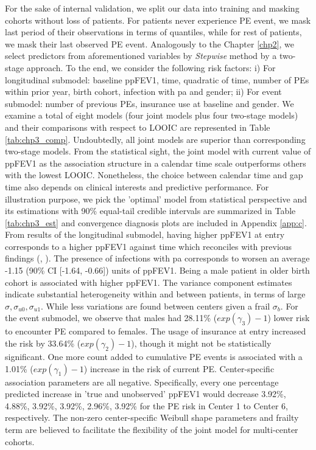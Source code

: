 For the sake of internal validation, we split our data into training and masking cohorts without loss of patients. For patients never experience PE event, we mask last period of their observations in terms of quantiles, while for rest of patients, we mask their last observed PE event. Analogously to the Chapter \ref{chp2}, we select predictors from aforementioned variables by \emph{Stepwise} method by a two-stage approach. To the end, we consider the following risk factors: i) For longitudinal submodel: baseline ppFEV1, time, quadratic of time, number of PEs within prior year, birth cohort, infection with pa and gender; ii) For event submodel: number of previous PEs, insurance use at baseline and gender. We examine a total of eight models (four joint models plus four two-stage models) and their comparisons with respect to LOOIC are represented in Table \ref{tab:chp3_comp}. Undoubtedly, all joint models are superior than corresponding two-stage models. From the statistical sight, the joint model with current value of ppFEV1 as the association structure in a calendar time scale outperforms others with the lowest LOOIC. Nonetheless, the choice between calendar time and gap time also depends on clinical interests and predictive performance. For illustration purpose, we pick the 'optimal' model from statistical perspective and its estimations with 90\% equal-tail credible intervals are summarized in Table \ref{tab:chp3_est} and convergence diagnosis plots are included in Appendix \ref{app:c}. From results of the longitudinal submodel, having higher ppFEV1 at entry corresponds to a higher ppFEV1 against time which reconciles with previous findings (\cite{TaylorRobinson2012}, \cite{Li2017}). The presence of infections with pa corresponds to worsen an average -1.15 (90\% CI [-1.64, -0.66]) units of ppFEV1. Being a male patient in older birth cohort is associated with higher ppFEV1. The variance component estimates indicate substantial heterogeneity within and between patients, in terms of large $\sigma,\sigma_{u0},\sigma_{u1}$. While less variations are found between centers given a frail $\sigma_b$. For the event submodel, we observe that males had 28.11\% ($exp(\gamma_3)-1$) lower risk to encounter PE compared to females. The usage of insurance at entry increased the risk by 33.64\% ($exp(\gamma_2)-1$), though it might not be statistically significant. One more count added to cumulative PE events is associated with a 1.01\% ($exp(\gamma_1)-1$) increase in the risk of current PE. Center-specific association parameters are all negative. Specifically, every one percentage predicted increase in 'true and unobserved' ppFEV1 would decrease 3.92\%, 4.88\%, 3.92\%, 3.92\%, 2.96\%, 3.92\% for the PE risk in Center 1 to Center 6, respectively. The non-zero center-specific Weibull shape parameters and frailty term are believed to facilitate the flexibility of the joint model for multi-center cohorts. 

